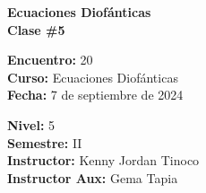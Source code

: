 \begin{center} \textbf
{
    \Large Ecuaciones Diofánticas \\ \vspace{2mm}Clase \#5
}
\end{center}

\begin{multicols}{2}
{
    \textbf{Encuentro:} 20\\
    \textbf{Curso:} Ecuaciones Diofánticas\\
    \textbf{Fecha:} 7 de septiembre de 2024\\
    \begin{flushright}
        \textbf{Nivel:} 5\\
        \textbf{Semestre:} II\\
        \textbf{Instructor:} Kenny Jordan Tinoco\\
        \textbf{Instructor Aux:} Gema Tapia
    \end{flushright}
}
\end{multicols}

\thispagestyle{first-page-style}